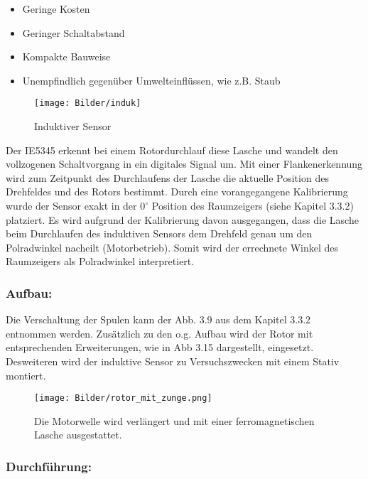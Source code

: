 \begin{itemize}
	\item Geringe Kosten
	\item Geringer Schaltabstand
	\item Kompakte Bauweise
	\item Unempfindlich gegenüber Umwelteinflüssen, wie z.B. Staub
\end{itemize}


\begin{figure}[H]
	\centering
	\texttt{[image: Bilder/induk]} 
	\caption{Induktiver Sensor \cite{induktiverse}}
	\label{fig: Induktiver Sensor}
\end{figure}



Der IE5345 erkennt bei einem Rotordurchlauf diese Lasche und wandelt den vollzogenen Schaltvorgang in ein digitales Signal um. Mit einer Flankenerkennung wird zum Zeitpunkt des Durchlaufens der Lasche die aktuelle Position des Drehfeldes und des Rotors bestimmt. Durch eine vorangegangene Kalibrierung wurde der Sensor exakt in der \(0^\circ\) Position des Raumzeigers (siehe Kapitel 3.3.2) platziert. Es wird aufgrund der Kalibrierung davon ausgegangen, dass die Lasche beim Durchlaufen des induktiven Sensors dem Drehfeld genau um den Polradwinkel nacheilt (Motorbetrieb). Somit wird der errechnete Winkel des Raumzeigers als Polradwinkel interpretiert.

\subsubsection{Aufbau:}


Die Verschaltung der Spulen kann der Abb. 3.9 aus dem Kapitel 3.3.2 entnommen werden. Zusätzlich zu den o.g. Aufbau wird der Rotor mit entsprechenden Erweiterungen, wie in Abb 3.15 dargestellt, eingesetzt. Desweiteren wird der induktive Sensor zu Versuchszwecken mit  einem Stativ montiert.

\begin{figure}[H]
	\centering
	\texttt{[image: Bilder/rotor\_mit\_zunge.png]} 
	\caption{Die Motorwelle wird verlängert und mit einer ferromagnetischen Lasche ausgestattet.}
	\label{fig: Rotor mit Lasche}
\end{figure}


\subsubsection{Durchführung:}

